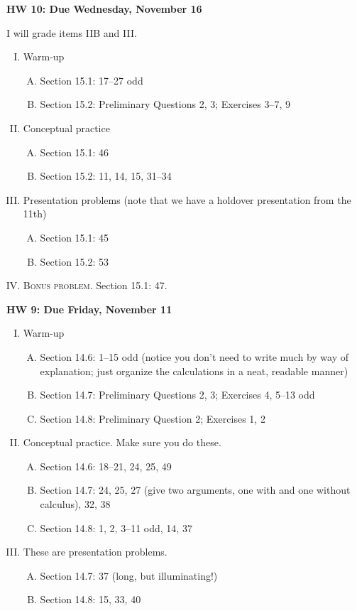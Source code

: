 \documentclass[10pt]{amsart}
\begin{document}
\begin{center}
\textbf{HW 10: Due Wednesday, November 16}
\end{center}
I will grade items IIB and III.
\begin{enumerate}[I.]
    \item Warm-up
    \begin{enumerate}[A.]
        \item Section 15.1: 17--27 odd
        \item Section 15.2: Preliminary Questions 2, 3; Exercises 3--7, 9
    \end{enumerate}
    \item Conceptual practice
    \begin{enumerate}[A.]
        \item Section 15.1: 46
        \item Section 15.2: 11, 14, 15, 31--34
    \end{enumerate}
    \item Presentation problems (note that we have a holdover presentation from the 11th)
    \begin{enumerate}[A.]
        \item Section 15.1: 45
        \item Section 15.2: 53
    \end{enumerate}
    \item \textsc{Bonus problem.} Section 15.1: 47.
\end{enumerate}
\begin{center}
\textbf{HW 9: Due Friday, November 11}
\end{center}
\begin{enumerate}[I.]
    \item Warm-up
    \begin{enumerate}[A.]
        \item Section 14.6: 1--15 odd (notice you don't need to write much by way of explanation; just organize the calculations in a neat, readable manner)
        \item Section 14.7: Preliminary Questions 2, 3; Exercises 4, 5--13 odd
        \item Section 14.8: Preliminary Question 2; Exercises 1, 2
    \end{enumerate}
    \item Conceptual practice. Make sure you do these.
    \begin{enumerate}[A.]
        \item Section 14.6: 18--21, 24, 25, 49
        \item Section 14.7: 24, 25, 27 (give two arguments, one with and one without calculus), 32, 38
        \item Section 14.8: 1, 2, 3--11 odd, 14, 37
    \end{enumerate}
    \item These are presentation problems.
    \begin{enumerate}[A.]
        \item Section 14.7: 37 (long, but illuminating!)
        \item Section 14.8: 15, 33, 40
    \end{enumerate}
\end{enumerate}
\end{document}
